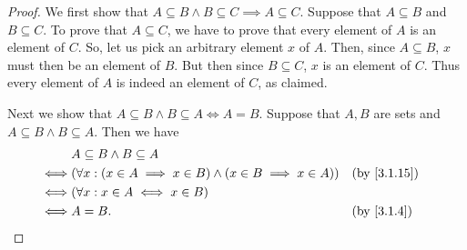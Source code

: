 \begin{proof}
	We first show that \(A \subseteq B \land B \subseteq C \implies A \subseteq C\).
	Suppose that \(A \subseteq B\) and \(B \subseteq C\).
	To prove that \(A \subseteq C\), we have to prove that every element of \(A\) is an element of \(C\).
	So, let us pick an arbitrary element \(x\) of \(A\).
	Then, since \(A \subseteq B\), \(x\) must then be an element of \(B\).
	But then since \(B \subseteq C\), \(x\) is an element of \(C\).
	Thus every element of \(A\) is indeed an element of \(C\), as claimed.

	Next we show that \(A \subseteq B \land B \subseteq A \iff A = B\).
	Suppose that \(A, B\) are sets and \(A \subseteq B \land B \subseteq A\).
	Then we have
	\begin{align*}
		     & A \subseteq B \land B \subseteq A                                                          \\
		\iff & (\forall x : (x \in A \implies x \in B) \land (x \in B \implies x \in A)) &  & \by{3.1.15} \\
		\iff & (\forall x : x \in A \iff x \in B)                                                         \\
		\iff & A = B.                                                                    &  & \by{3.1.4}
	\end{align*}


\end{proof}
